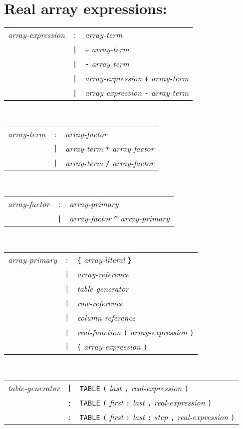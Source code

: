\section*{Real array expressions:}
\begin{tabular}{p{4cm}cl}
\textit{array-expression}
  &:& \textit{array-term} \\
  &\texttt{|}& \texttt{+} \textit{array-term} \\
  &\texttt{|}& \texttt{-} \textit{array-term} \\
  &\texttt{|}& \textit{array-expression} \texttt{+} \textit{array-term} \\
  &\texttt{|}& \textit{array-expression} \texttt{-} \textit{array-term}
\end{tabular}
\\
\begin{tabular}{p{4cm}cl}
\textit{array-term}
  &:& \textit{array-factor} \\
  &\texttt{|}& \textit{array-term} \texttt{*} \textit{array-factor} \\
  &\texttt{|}& \textit{array-term} \texttt{/} \textit{array-factor}
\end{tabular}
\\
\begin{tabular}{p{4cm}cl}
\textit{array-factor}
  &:& \textit{array-primary} \\
  &\texttt{|}& \textit{array-factor} \texttt{\^{}} \textit{array-primary}
\end{tabular}
\\
\begin{tabular}{p{4cm}cl}
\textit{array-primary}
  &:& \texttt{\{} \textit{array-literal} \texttt{\}} \\
  &\texttt{|}& \textit{array-reference} \\
  &\texttt{|}& \textit{table-generator} \\
  &\texttt{|}& \textit{row-reference} \\
  &\texttt{|}& \textit{column-reference} \\
  &\texttt{|}& \textit{real-function}
    \texttt{(} \textit{array-expression} \texttt{)} \\
  &\texttt{|}& \texttt{(} \textit{array-expression} \texttt{)}
\end{tabular}
\\
\begin{tabular}{p{4cm}cl}
\textit{table-generator}
  &\texttt{|}& \texttt{TABLE} \texttt{(} \textit{last} \texttt{,}
    \textit{real-expression} \texttt{)} \\
  &:& \texttt{TABLE} \texttt{(} \textit{first} \texttt{:}
    \textit{last} \texttt{,} \textit{real-expression} \texttt{)} \\
  &:& \texttt{TABLE} \texttt{(} \textit{first} \texttt{:}
    \textit{last} \texttt{:} \textit{step} \texttt{,}
    \textit{real-expression} \texttt{)}
\end{tabular}
